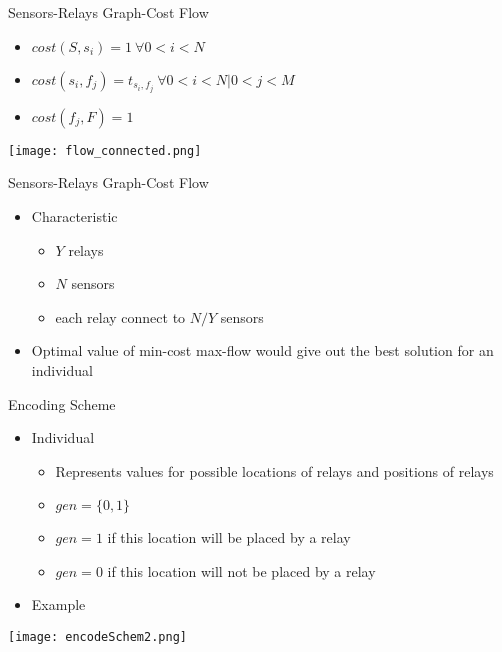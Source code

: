 \documentclass[main.tex]{subfiles}
\begin{document}
\begin{frame}{Sensors-Relays Graph-Cost Flow}
\begin{itemize}
\item $cost(S, s_i) = 1 ~ \forall 0 < i < N$
\item $cost(s_i, f_j) = t_{s_i, f_j} ~ \forall 0 < i < N | 0 < j < M$
\item $cost(f_j, F) =  1$
\end{itemize}

\begin{center}
\texttt{[image: flow\_connected.png]}

\end{center}
\end{frame}

\begin{frame}{Sensors-Relays Graph-Cost Flow}
\begin{itemize}
\item Characteristic
\begin{itemize}
\item $Y$ relays
\item $N$ sensors
\item each relay connect to $N/Y$ sensors
\end{itemize}
\item Optimal value of min-cost max-flow would give out the best solution for an individual
\end{itemize}
\end{frame}

\begin{frame}{Encoding Scheme}
	\begin{itemize}
		\item Individual
			\begin{itemize}
				\item Represents values for possible locations of relays and positions of relays
				\item $gen = \{0, 1\}$
				\item $gen = 1$ if this location will be placed by a relay
				\item $gen = 0$ if this location will not be placed by a relay
			\end{itemize}
		\item Example
	\end{itemize}
	\begin{center}
		\texttt{[image: encodeSchem2.png]}
	\end{center}
\end{frame}
\end{document}

